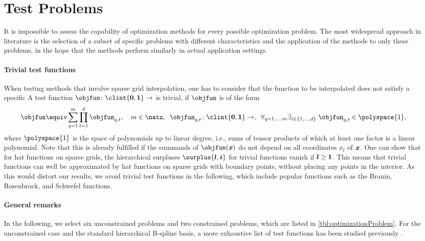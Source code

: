 \section{Test Problems}
\label{sec:52testProblems}

It is impossible to assess the capability of optimization methods
for every possible optimization problem.
The most widespread approach in literature
is the selection of a subset of specific problems
with different characteristics  and
the application of the methods to only these problems,
in the hope that the methods perform similarly in
actual application settings.

\paragraph{Trivial test functions}

When testing methods that involve sparse grid interpolation,
one has to consider that the function to be interpolated
does not satisfy a specific 
A test function $\objfun\colon \clint{\*0, \*1} \to \real$ is trivial, if
$\objfun$ is of the form
\begin{equation}
  \objfun \equiv \sum_{q=1}^m \prod_{t=1}^d \objfun_{q,t},\quad
  m \in \natz,\;\;
  \objfun_{q,t}\colon \clint{\*0, \*1} \to \real,\;\;
  \faex{q = 1, \dotsc, m}{t \in \{1, \dotsc, d\}}{
    \objfun_{q,t} \in \polyspace{1},
  }
\end{equation}
where $\polyspace{1}$ is the space of polynomials up to linear degree,
i.e., sums of tensor products of which at least one factor is a
linear polynomial.
Note that this is already fulfilled if the summands of $\objfun(\*x)$
do not depend on all coordinates $x_t$ of ${\boldsymbol{x}}$.
One can show that for hat functions on sparse grids,
the hierarchical surpluses $\surplus{\*l,\*i}$ for trivial functions
vanish if ${\boldsymbol{l}} \ge {\boldsymbol{1}}$.
This means that trivial functions can well be approximated by hat functions
on sparse grids with boundary points, without placing any points
in the interior.
As this would distort our results,
we avoid trivial test functions in the following,
which include popular functions such as the
Branin, Rosenbrock, and Schwefel functions.

\paragraph{General remarks}

In the following, we select six unconstrained problems
and two constrained problems, which are listed in
\cref{tbl:optimizationProblem}.
For the unconstrained case and the standard hierarchical
B-spline basis, a more exhaustive list of test functions has been
studied previously \cite{Valentin14Hierarchische}.

